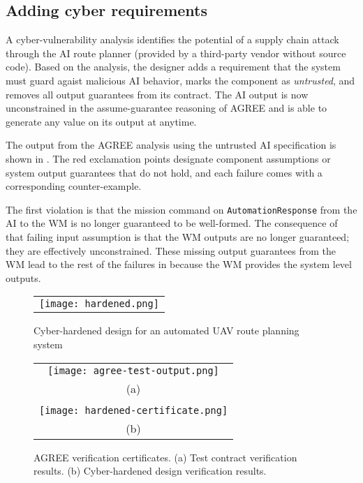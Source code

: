 \subsection{Adding cyber requirements}

A cyber-vulnerability analysis identifies the potential of a
supply chain attack through the AI route planner (provided by a
third-party vendor without source code).  Based on the analysis, the designer adds a requirement that the system must guard agaist malicious AI behavior, marks the component as \emph{untrusted}, and removes all output guarantees from its contract.  The AI output is now unconstrained in the
assume-guarantee reasoning of AGREE and is able to generate any value
on its output at anytime. 

The output from the AGREE analysis using the untrusted AI
specification is shown in .  The red
exclamation points designate component assumptions or system output
guarantees that do not hold, and each failure comes with a
corresponding counter-example.  

The first violation is that the mission command on \texttt{AutomationResponse} from
the AI to the WM is no longer guaranteed to be well-formed.  The
consequence of that failing input assumption is that the WM outputs
are no longer guaranteed; they are effectively unconstrained.  These
missing output guarantees from the WM lead to the rest of the failures
in  because the WM provides the system
level outputs.

\begin{figure*}
  \begin{center}
    \begin{tabular}{c}
      \texttt{[image: hardened.png]}
    \end{tabular}
  \end{center}
  \caption{Cyber-hardened design for an automated UAV route planning system}
  \label{fig:hardened}
\end{figure*}

\begin{figure}
  \begin{center}
    \begin{tabular}{c}
      \texttt{[image: agree-test-output.png]} \\
      (a) \\ \\
      \texttt{[image: hardened-certificate.png]} \\
      (b)    
    \end{tabular}
  \end{center}
  \caption{AGREE verification certificates. (a) Test contract verification results. (b) Cyber-hardened design verification results.}
  \label{fig:hardened-certificate}
\end{figure}

